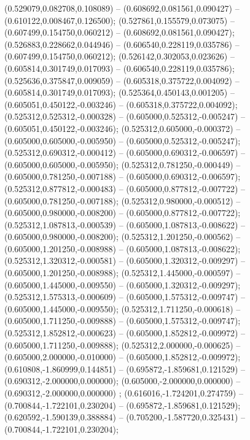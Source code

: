  (0.529079,0.082708,0.108089) -- (0.608692,0.081561,0.090427) -- (0.610122,0.008467,0.126500);
 (0.527861,0.155579,0.073075) -- (0.607499,0.154750,0.060212) -- (0.608692,0.081561,0.090427);
 (0.526883,0.228662,0.044946) -- (0.606540,0.228119,0.035786) -- (0.607499,0.154750,0.060212);
 (0.526142,0.302053,0.023626) -- (0.605814,0.301749,0.017093) -- (0.606540,0.228119,0.035786);
 (0.525636,0.375847,0.009059) -- (0.605318,0.375722,0.004092) -- (0.605814,0.301749,0.017093);
 (0.525364,0.450143,0.001205) -- (0.605051,0.450122,-0.003246) -- (0.605318,0.375722,0.004092);
 (0.525312,0.525312,-0.000328) -- (0.605000,0.525312,-0.005247) -- (0.605051,0.450122,-0.003246);
 (0.525312,0.605000,-0.000372) -- (0.605000,0.605000,-0.005950) -- (0.605000,0.525312,-0.005247);
 (0.525312,0.690312,-0.000412) -- (0.605000,0.690312,-0.006597) -- (0.605000,0.605000,-0.005950);
 (0.525312,0.781250,-0.000449) -- (0.605000,0.781250,-0.007188) -- (0.605000,0.690312,-0.006597);
 (0.525312,0.877812,-0.000483) -- (0.605000,0.877812,-0.007722) -- (0.605000,0.781250,-0.007188);
 (0.525312,0.980000,-0.000512) -- (0.605000,0.980000,-0.008200) -- (0.605000,0.877812,-0.007722);
 (0.525312,1.087813,-0.000539) -- (0.605000,1.087813,-0.008622) -- (0.605000,0.980000,-0.008200);
 (0.525312,1.201250,-0.000562) -- (0.605000,1.201250,-0.008988) -- (0.605000,1.087813,-0.008622);
 (0.525312,1.320312,-0.000581) -- (0.605000,1.320312,-0.009297) -- (0.605000,1.201250,-0.008988);
 (0.525312,1.445000,-0.000597) -- (0.605000,1.445000,-0.009550) -- (0.605000,1.320312,-0.009297);
 (0.525312,1.575313,-0.000609) -- (0.605000,1.575312,-0.009747) -- (0.605000,1.445000,-0.009550);
 (0.525312,1.711250,-0.000618) -- (0.605000,1.711250,-0.009888) -- (0.605000,1.575312,-0.009747);
 (0.525312,1.852812,-0.000623) -- (0.605000,1.852812,-0.009972) -- (0.605000,1.711250,-0.009888);
 (0.525312,2.000000,-0.000625) -- (0.605000,2.000000,-0.010000) -- (0.605000,1.852812,-0.009972);
 (0.610808,-1.860999,0.144851) -- (0.695872,-1.859681,0.121529) -- (0.690312,-2.000000,0.000000);
 (0.605000,-2.000000,0.000000) -- (0.690312,-2.000000,0.000000) ;
 (0.616016,-1.724201,0.274759) -- (0.700844,-1.722101,0.230204) -- (0.695872,-1.859681,0.121529);
 (0.620592,-1.590139,0.388884) -- (0.705200,-1.587720,0.325431) -- (0.700844,-1.722101,0.230204);

